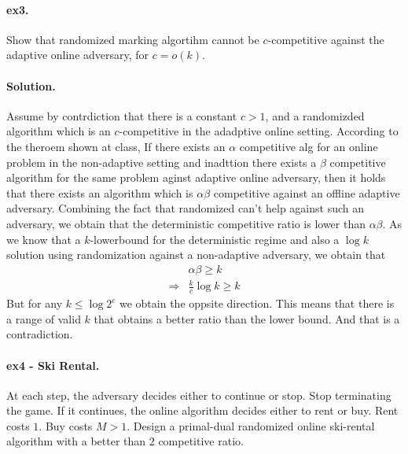 \documentclass{article}
\begin{document}
\begin{multicols*}{2}
  \paragraph{ex3.} Show that randomized marking algortihm cannot be $c$-competitive against the adaptive online adversary, for $c=o\left( k \right)$. 
  \paragraph{Solution.} Assume by contrdiction that there is a constant $c> 1$, and a randomizded algorithm which is an $c$-competitive in the adadptive online setting. According to the theroem shown at class, If there exists an $\alpha$ competitive alg for an online problem in the non-adaptive setting and inadttion there exists a $\beta$ competitive algorithm for the same problem aginst adaptive online adversary, then it holds that there exists an algorithm which is $\alpha\beta$ competitive against an offline adaptive adversary. 
  Combining the fact that randomized can't help against such an adversary, we obtain that the deterministic competitive ratio is lower than $\alpha\beta$. As we know that a $k$-lowerbound for the deterministic regime and also a $\log k$ solution using randomization against a non-adaptive adversary, we obtain that      
  \begin{equation*}
    \begin{split}
      & \alpha\beta \ge k \\ 
      \Rightarrow  & \frac{k}{c}\log k \ge k 
    \end{split}
  \end{equation*} But for any $ k \le \log 2^{c} $ we obtain the oppsite direction. This means that there is a range of valid $k$ that obtains a better ratio than the lower bound. And that is a contradiction.   

  \paragraph{ex4 - Ski Rental.} At each step, the adversary decides either to continue or stop. Stop terminating the game. If it continues, the online algorithm decides either to rent or buy. Rent costs $1$. Buy costs $M > 1$. Design a primal-dual randomized online ski-rental algorithm with a better than $2$ competitive ratio.  

\end{multicols*}
\end{document}
